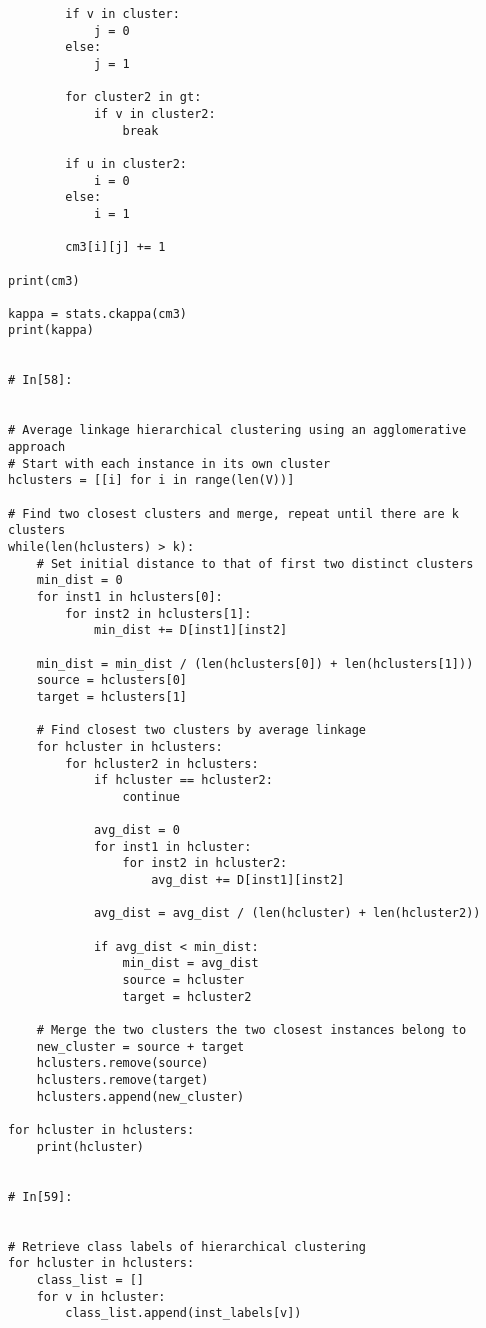 \documentclass[11pt, a4paper]{article}
\begin{document}
\begin{verbatim}
        if v in cluster:
            j = 0
        else:
            j = 1
            
        for cluster2 in gt:
            if v in cluster2:
                break
                
        if u in cluster2:
            i = 0
        else:
            i = 1
            
        cm3[i][j] += 1
        
print(cm3)

kappa = stats.ckappa(cm3)
print(kappa)


# In[58]:


# Average linkage hierarchical clustering using an agglomerative approach
# Start with each instance in its own cluster
hclusters = [[i] for i in range(len(V))]

# Find two closest clusters and merge, repeat until there are k clusters
while(len(hclusters) > k):
    # Set initial distance to that of first two distinct clusters
    min_dist = 0
    for inst1 in hclusters[0]:
        for inst2 in hclusters[1]:
            min_dist += D[inst1][inst2]

    min_dist = min_dist / (len(hclusters[0]) + len(hclusters[1]))
    source = hclusters[0]
    target = hclusters[1]

    # Find closest two clusters by average linkage
    for hcluster in hclusters:           
        for hcluster2 in hclusters:
            if hcluster == hcluster2:
                continue

            avg_dist = 0
            for inst1 in hcluster:
                for inst2 in hcluster2:
                    avg_dist += D[inst1][inst2]
                    
            avg_dist = avg_dist / (len(hcluster) + len(hcluster2))
            
            if avg_dist < min_dist:
                min_dist = avg_dist
                source = hcluster
                target = hcluster2

    # Merge the two clusters the two closest instances belong to
    new_cluster = source + target
    hclusters.remove(source)
    hclusters.remove(target)
    hclusters.append(new_cluster)
    
for hcluster in hclusters:
    print(hcluster)


# In[59]:


# Retrieve class labels of hierarchical clustering
for hcluster in hclusters:
    class_list = []
    for v in hcluster:
        class_list.append(inst_labels[v])
        

\end{verbatim}
\end{document}
